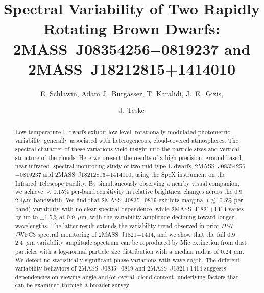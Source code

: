 \documentclass[twocolumn]{aastex6}
\begin{document}
\title{Spectral Variability of Two Rapidly Rotating Brown Dwarfs: \\2MASS~J08354256$-$0819237 and 2MASS~J18212815+1414010}


\author{E. Schlawin, Adam J.\ Burgasser, T. Karalidi, J.\ E.\  Gizis,  \and J. Teske}


\begin{abstract}
Low-temperature L dwarfs exhibit low-level, rotationally-modulated photometric variability generally associated with heterogeneous, cloud-covered atmospheres. The spectral character of these variations yield insight into the particle sizes and vertical structure of the clouds. Here we present the results of a high precision, ground-based, near-infrared, spectral monitoring study of two mid-type L dwarfs, 2MASS~J08354256$-$0819237 and 2MASS~J18212815+1414010, using the SpeX instrument on the Infrared Telescope Facility. By simultaneously observing a nearby visual companion, we achieve $<$0.15\% per-band sensitivity in relative brightness changes across the 0.9--2.4$\mu$m bandwidth. We find that 2MASS~J0835$-$0819 exhibits marginal ($\lesssim$ 0.5\% per band) variability with no clear spectral dependence, while 2MASS~J1821+1414 varies by up to $\pm$1.5\% at 0.9~$\mu$m, with the variability amplitude declining toward longer wavelengths. The latter result extends the variability trend observed in prior $HST$/WFC3 spectral monitoring of 2MASS~J1821+1414, and we show that the full 0.9--2.4~$\mu$m variability amplitude spectrum can be reproduced by Mie extinction from dust particles with a log-normal particle size distribution with a median radius of 0.24 $\mu$m. We detect no statistically significant phase variations with wavelength. The different variability behaviors of 2MASS~J0835$-$0819 and  2MASS~J1821+1414 suggests dependencies on viewing angle and/or overall cloud content, underlying factors that can be examined through a broader survey.
\end{abstract}
\end{document}
